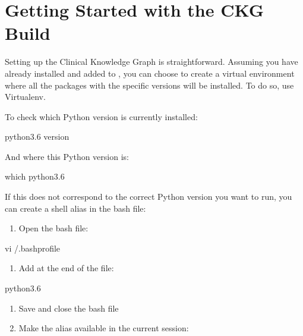 \documentclass[letterpaper,10pt,english]{sphinxmanual}
\begin{document}
\section{Getting Started with the CKG Build}
\label{\detokenize{intro/getting-started-with-build:getting-started-with-the-ckg-build}}\label{\detokenize{intro/getting-started-with-build::doc}}
Setting up the Clinical Knowledge Graph is straightforward.
Assuming you have  already installed and added to , you can choose to create a virtual environment where all the packages with the specific versions will be installed. To do so, use Virtualenv.

To check which Python version is currently installed:

\begin{sphinxVerbatim}[commandchars=\\\{\}]
\PYGZdl{} python3.6 \PYGZhy{}\PYGZhy{}version
\end{sphinxVerbatim}

And where this Python version is:

\begin{sphinxVerbatim}[commandchars=\\\{\}]
\PYGZdl{} which python3.6
\end{sphinxVerbatim}

If this does not correspond to the correct Python version you want to run, you can create a shell alias in the bash file:
\begin{enumerate}
%
\item {} 
Open the bash file:

\end{enumerate}

\begin{sphinxVerbatim}[commandchars=\\\{\}]
\PYGZdl{} vi \PYGZti{}/.bash\PYGZus{}profile
\end{sphinxVerbatim}
\begin{enumerate}
%
\item {} 
Add at the end of the file:

\end{enumerate}

\begin{sphinxVerbatim}[commandchars=\\\{\}]
 python3.6
\end{sphinxVerbatim}
\begin{enumerate}
%
\item {} 
Save and close the bash file

\item {} 
Make the alias available in the current session:

\end{enumerate}
\end{document}
